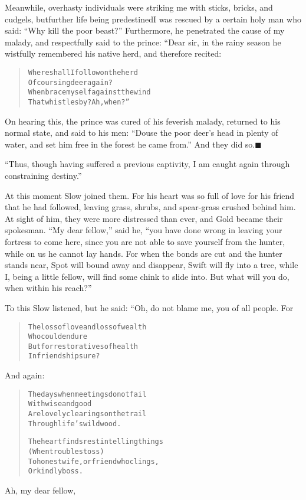 \documentclass[article, twoside, 14pt]{memoir}
\newcommand{\qed}{\hfill \ensuremath{\blacksquare}}
\renewenvironment{verbatim}{%
\begin{quote}%
\vskip -10pt%
\begin{alltt}\normalfont\large}{\end{alltt}%
\end{quote}%
\vskip -10pt
} %
\begin{document}
Meanwhile, overhasty individuals were striking me with sticks,
bricks, and cudgels, but{\textemdash}further life being predestined{\textemdash}I was
rescued by a certain holy man who said:
``Why kill the poor beast?'' Furthermore, he penetrated the
cause of my malady, and respectfully said to the prince: “Dear sir,
in the rainy season he wistfully remembered his native herd, and
therefore recited:

\begin{verbatim}
Where shall I follow on the herd
    Of coursing deer again?
When brace myself against the wind
    That whistles by? Ah, when?”
\end{verbatim}
On hearing this, the prince was cured of his feverish malady,
returned to his normal state, and said to his men:
``Douse the poor deer's head in plenty of water, and set him free in the forest he came from.''
And they did so.\hyperref[s45]{\qed}

``Thus, though having suffered a previous captivity, I am caught again through constraining destiny.''

At this moment Slow joined them. For his heart was so full of love
for his friend that he had followed, leaving grass, shrubs, and
spear-grass crushed behind him. At sight of him, they were more
distressed than ever, and Gold became their spokesman.
``My dear fellow,'' said he,
``you have done wrong in leaving your fortress to come here, since you are not able to save yourself from the hunter, while on us he cannot lay hands. For when the bonds are cut and the hunter stands near, Spot will bound away and disappear, Swift will fly into a tree, while I, being a little fellow, will find some chink to slide into. But what will you do, when within his reach?''

To this Slow listened, but he said: “Oh, do not blame me, you of
all people. For

\begin{verbatim}
The loss of love and loss of wealth
    Who could endure
But for restoratives of health
    In friendship sure?
\end{verbatim}
And again:

\begin{verbatim}
The days when meetings do not fail
    With wise and good
Are lovely clearings on the trail
    Through life's wild wood.

The heart finds rest in telling things
    (When troubles toss)
To honest wife, or friend who clings,
    Or kindly boss.
\end{verbatim}
Ah, my dear fellow,
\end{document}

